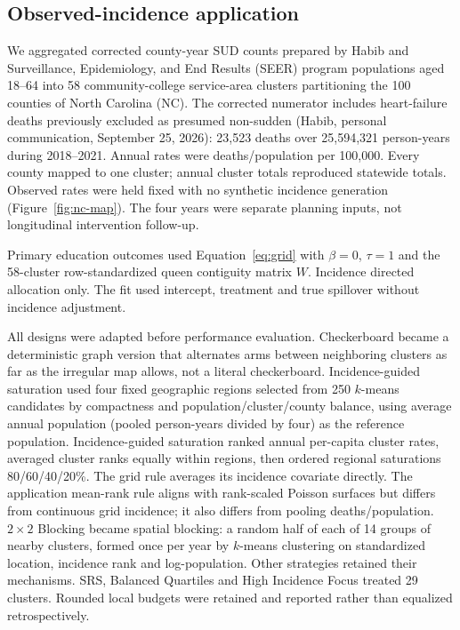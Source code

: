 \documentclass[Afour,sagev,times]{sagej}
\begin{document}
\subsection{Observed-incidence application}
We aggregated corrected county-year SUD counts prepared by Habib\cite{habib_temporal_2026} and Surveillance, Epidemiology, and End Results (SEER) program populations aged 18--64 into 58 community-college service-area clusters partitioning the 100 counties of North Carolina (NC). The corrected numerator includes heart-failure deaths previously excluded as presumed non-sudden (Habib, personal communication, September 25, 2026): 23,523 deaths over 25,594,321 person-years during 2018--2021. Annual rates were deaths/population per 100,000. Every county mapped to one cluster; annual cluster totals reproduced statewide totals. Observed rates were held fixed with no synthetic incidence generation (Figure~\ref{fig:nc-map}). The four years were separate planning inputs, not longitudinal intervention follow-up.
\ifctjreading
\CTJMapFigure
\fi

Primary education outcomes used Equation~\ref{eq:grid} with $\beta=0$, $\tau=1$ and the 58-cluster row-standardized queen contiguity matrix $W$. Incidence directed allocation only. The fit used intercept, treatment and true spillover without incidence adjustment.

All designs were adapted before performance evaluation. Checkerboard became a deterministic graph version that alternates arms between neighboring clusters as far as the irregular map allows, not a literal checkerboard. Incidence-guided saturation used four fixed geographic regions selected from 250 $k$-means candidates by compactness and population/cluster/county balance, using average annual population (pooled person-years divided by four) as the reference population. Incidence-guided saturation ranked annual per-capita cluster rates, averaged cluster ranks equally within regions, then ordered regional saturations 80/60/40/20\%. The grid rule averages its incidence covariate directly. The application mean-rank rule aligns with rank-scaled Poisson surfaces but differs from continuous grid incidence; it also differs from pooling deaths/population. $2\times2$ Blocking became spatial blocking: a random half of each of 14 groups of nearby clusters, formed once per year by $k$-means clustering on standardized location, incidence rank and log-population. Other strategies retained their mechanisms. SRS, Balanced Quartiles and High Incidence Focus treated 29 clusters. Rounded local budgets were retained and reported rather than equalized retrospectively.
\end{document}
